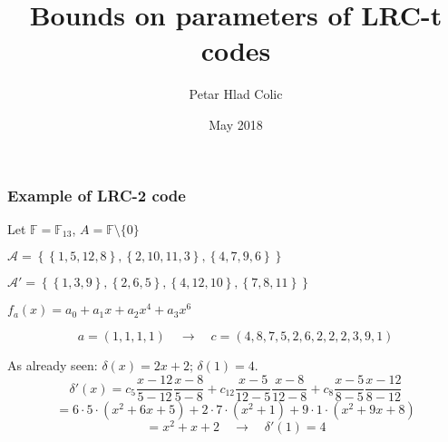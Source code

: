 \documentclass[envcountsect]{beamer}
\title{Bounds on parameters of LRC-t codes}
\author{Petar Hlad Colic}
\institute{Universitat Polit\`ecnica de Catalunya}
\date{May 2018}
\newcommand{\FF}{\mathbb{F}}
\begin{document}
    \frame{\titlepage}
    
    \frame{\tableofcontents}
    
    
    
    
    
    
    
    \begin{frame}
        \frametitle{Example of LRC-2 code}
        
        Let $\FF = \FF_{13}$, $A = \FF \setminus \{0\}$
        
        $\mathcal{A} = \left\lbrace  \left\lbrace 1, 5, 12 , 8 \right\rbrace, \left\lbrace 2 , 10 , 11 , 3 \right\rbrace , \left\lbrace 4 , 7 , 9 , 6 \right\rbrace \right\rbrace$
        
        $\mathcal{A'} = \left\lbrace  \left\lbrace 1 , 3 , 9 \right\rbrace, \left\lbrace 2 , 6 , 5 \right\rbrace , \left\lbrace 4 , 12 , 10 \right\rbrace , \left\lbrace 7 , 8 , 11 \right\rbrace \right\rbrace$
        
        $f_a(x) = a_0 + a_1 x + a_2 x^4 + a_3 x^6$
        
        $$a = (1,1,1,1) \quad \longrightarrow \quad c = (4,8,7,5,2,6,2,2,2,3,9,1)$$
        
        As already seen: $\delta(x) = 2x + 2$; $\delta(1)=4$.
        $$\delta ' (x) = c_5 \frac{x-12}{5-12}\frac{x-8}{5-8} + c_{12} \frac{x-5}{12-5}\frac{x-8}{12-8} + c_8 \frac{x-5}{8-5}\frac{x-12}{8-12}$$
        $$ = 6 \cdot 5 \cdot (x^2 + 6x + 5) + 2 \cdot 7 \cdot (x^2 + 1) + 9 \cdot 1 \cdot (x^2 + 9x + 8)$$
        $$ = x^2 + x + 2 \quad \longrightarrow \quad \delta ' (1) = 4$$
    \end{frame}        
    
    
\end{document}

